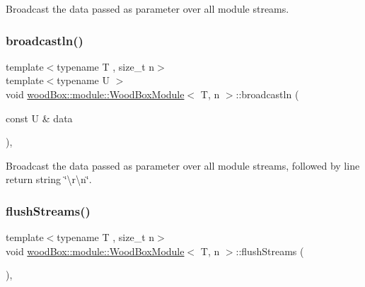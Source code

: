 Broadcast the data passed as parameter over all module streams. \mbox{\label{classwood_box_1_1module_1_1_wood_box_module_a5329c737b0a102851782b5d2a6019bc8}} 
\subsubsection{\texorpdfstring{broadcastln()}{broadcastln()}}
{\footnotesize\ttfamily template$<$typename T , size\+\_\+t n$>$ \\
template$<$typename U $>$ \\
void \mbox{\hyperlink{classwood_box_1_1module_1_1_wood_box_module}{wood\+Box\+::module\+::\+Wood\+Box\+Module}}$<$ T, n $>$\+::broadcastln (\begin{DoxyParamCaption}\item[{const U \&}]{data }\end{DoxyParamCaption})\hspace{0.3cm}{\ttfamily [inline]}, {\ttfamily [protected]}}

Broadcast the data passed as parameter over all module streams, followed by line return string \char`\"{}\textbackslash{}r\textbackslash{}n\char`\"{}. \mbox{\label{classwood_box_1_1module_1_1_wood_box_module_a240ad6ff3f905a531fcc62670a26a6fa}} 
\subsubsection{\texorpdfstring{flush\+Streams()}{flushStreams()}}
{\footnotesize\ttfamily template$<$typename T , size\+\_\+t n$>$ \\
void \mbox{\hyperlink{classwood_box_1_1module_1_1_wood_box_module}{wood\+Box\+::module\+::\+Wood\+Box\+Module}}$<$ T, n $>$\+::flush\+Streams (\begin{DoxyParamCaption}{ }\end{DoxyParamCaption})\hspace{0.3cm}{\ttfamily [inline]}, {\ttfamily [protected]}}

